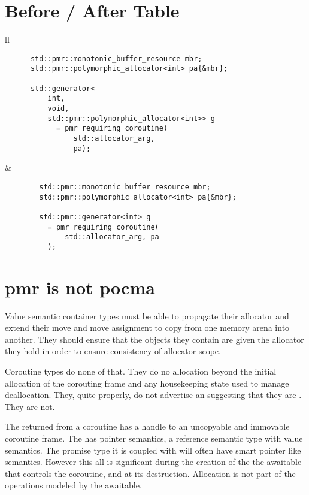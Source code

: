 \documentclass[a4paper,10pt,oneside,openany,final,article]{memoir}
\begin{document}
\chapter{Before / After Table}
\begin{tabular}{ ll }
  \begin{minipage}[t]{0.45\columnwidth}
    \begin{verbatim}
      std::pmr::monotonic_buffer_resource mbr;
      std::pmr::polymorphic_allocator<int> pa{&mbr};

      std::generator<
          int,
          void,
          std::pmr::polymorphic_allocator<int>> g
            = pmr_requiring_coroutine(
                std::allocator_arg,
                pa);
    \end{verbatim}
  \end{minipage}
  &
    \begin{minipage}[t]{0.45\columnwidth}
      \begin{verbatim}
        std::pmr::monotonic_buffer_resource mbr;
        std::pmr::polymorphic_allocator<int> pa{&mbr};

        std::pmr::generator<int> g
          = pmr_requiring_coroutine(
              std::allocator_arg, pa
          );
      \end{verbatim}
    \end{minipage}
\end{tabular}

\chapter{pmr is not pocma}
Value semantic container types must be able to propagate their allocator and extend their move and move assignment to copy from one memory arena into another. They should ensure that the objects they contain are given the allocator they hold in order to ensure consistency of allocator scope.

Coroutine types do none of that. They do no allocation beyond the initial allocation of the corouting frame and any housekeeping state used to manage deallocation. They, quite properly, do not advertise an  suggesting that they are . They are not.

The  returned from a coroutine has a handle to an uncopyable and immovable coroutine frame. The  has pointer semantics, a reference semantic type with value semantics. The promise type it is coupled with will often have smart pointer like semantics. However this all is significant during the creation of the the awaitable that controls the coroutine, and at its destruction. Allocation is not part of the operations modeled by the awaitable.
\end{document}
